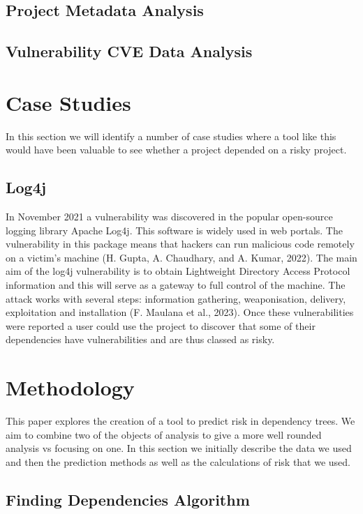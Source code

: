 \documentclass[10pt, onecolumn, compsoc, conference]{IEEEtran}
\begin{document}
\subsection{Project Metadata Analysis}


\subsection{Vulnerability CVE Data Analysis}
\section{Case Studies}
In this section we will identify a number of case studies where a tool like this would have been valuable to see whether a project depended on a risky project. 

\subsection{Log4j}
In November 2021 a vulnerability was discovered in the popular open-source logging library Apache Log4j. This software is widely used in web portals. The vulnerability in this package means that hackers can run malicious code remotely on a victim's machine (H. Gupta, A. Chaudhary, and A. Kumar, 2022). The main aim of the log4j vulnerability is to obtain Lightweight Directory Access Protocol information and this will serve as a gateway to full control of the machine. The attack works with several steps: information gathering, weaponisation, delivery, exploitation and installation (F. Maulana et al., 2023). Once these vulnerabilities were reported a user could use the project to discover that some of their dependencies have vulnerabilities and are thus classed as risky. 


\section{Methodology}
This paper explores the creation of a tool to predict risk in dependency trees. We aim to combine two of the objects of analysis to give a more well rounded analysis vs focusing on one. In this section we initially describe the data we used and then the prediction methods as well as the calculations of risk that we used. 

\subsection{Finding Dependencies Algorithm}
\end{document}
